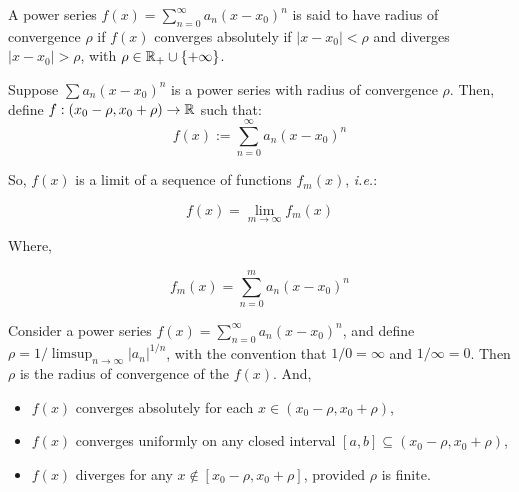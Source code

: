 \begin{definition}
    A power series $f(x) = \sum_{n=0}^\infty a_n(x - x_0)^n$ is said to have radius of convergence $\rho$ if $f(x)$ converges absolutely if $|x-x_0| < \rho$ and diverges $|x - x_0| > \rho$, with $\rho \in \mathbb{R}_+\cup \{ +\infty\}$.
\end{definition}

Suppose $\sum a_n(x-x_0)^n$ is a power series with radius of convergence $\rho$. Then, define $f: (x_0 - \rho, x_0 + \rho) \to \mathbb{R}$ such that:
\begin{equation*}
    f(x) := \sum \limits_{n=0}^\infty a_n (x - x_0)^n
\end{equation*}

So, $f(x)$ is a limit of a sequence of functions $f_m(x)$, \emph{i.e.}:

\begin{equation*}
    f(x) = \lim \limits_{m \to \infty} f_m(x)
\end{equation*}

Where,

\begin{equation*}
    f_m(x) = \sum \limits_{n=0}^m a_n(x-x_0)^n
\end{equation*}

\begin{theorem}
    Consider a power series $f(x) = \sum_{n=0}^\infty a_n (x - x_0)^n$, and define \\ $\rho = 1/\limsup_{n \to \infty} |a_n|^{1/n}$, with the convention that $1/0=\infty$ and $1/\infty=0$. Then $\rho$ is the radius of convergence of the $f(x)$. And,
    \begin{itemize}
        \item $f(x)$ converges absolutely for each $x \in (x_0 - \rho, x_0 + \rho)$,
        \item $f(x)$ converges uniformly on any closed interval $[a,b] \subseteq (x_0 - \rho, x_0 + \rho)$,
        \item $f(x)$ diverges for any $x \not \in [x_0 -\rho, x_0 + \rho]$, provided $\rho$ is finite.
    \end{itemize}
\end{theorem}

